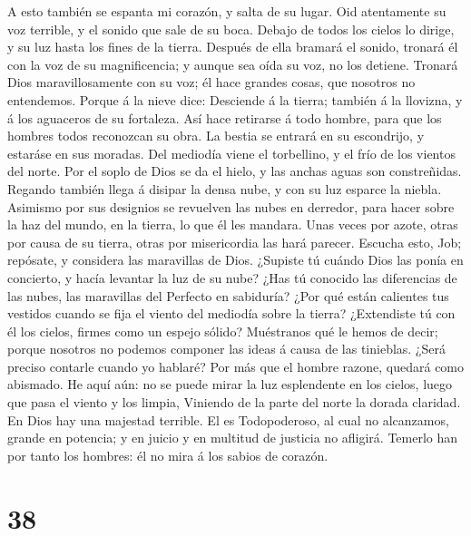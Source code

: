  A esto también se espanta mi corazón, y salta de su
lugar.  Oid atentamente su voz terrible, y el sonido que
sale de su boca.  Debajo de todos los cielos lo dirige, y
su luz hasta los fines de la tierra.  Después de ella
bramará el sonido, tronará él con la voz de su magnificencia; y aunque
sea oída su voz, no los detiene.  Tronará Dios
maravillosamente con su voz; él hace grandes cosas, que nosotros no
entendemos.  Porque á la nieve dice: Desciende á la
tierra; también á la llovizna, y á los aguaceros de su fortaleza.
 Así hace retirarse á todo hombre, para que los hombres
todos reconozcan su obra.  La bestia se entrará en su
escondrijo, y estaráse en sus moradas.  Del mediodía viene
el torbellino, y el frío de los vientos del norte.  Por
el soplo de Dios se da el hielo, y las anchas aguas son constreñidas.
 Regando también llega á disipar la densa nube, y con su
luz esparce la niebla.  Asimismo por sus designios se
revuelven las nubes en derredor, para hacer sobre la haz del mundo, en
la tierra, lo que él les mandara.  Unas veces por azote,
otras por causa de su tierra, otras por misericordia las hará parecer.
 Escucha esto, Job; repósate, y considera las maravillas
de Dios.  ¿Supiste tú cuándo Dios las ponía en concierto,
y hacía levantar la luz de su nube?  ¿Has tú conocido las
diferencias de las nubes, las maravillas del Perfecto en sabiduría?
 ¿Por qué están calientes tus vestidos cuando se fija el
viento del mediodía sobre la tierra?  ¿Extendiste tú con
él los cielos, firmes como un espejo sólido?  Muéstranos
qué le hemos de decir; porque nosotros no podemos componer las ideas á
causa de las tinieblas.  ¿Será preciso contarle cuando yo
hablaré? Por más que el hombre razone, quedará como abismado.
 He aquí aún: no se puede mirar la luz esplendente en los
cielos, luego que pasa el viento y los limpia,  Viniendo
de la parte del norte la dorada claridad. En Dios hay una majestad
terrible.  El es Todopoderoso, al cual no alcanzamos,
grande en potencia; y en juicio y en multitud de justicia no afligirá.
 Temerlo han por tanto los hombres: él no mira á los
sabios de corazón.

\hypertarget{section-37}{%
\section{38}\label{section-37}}

